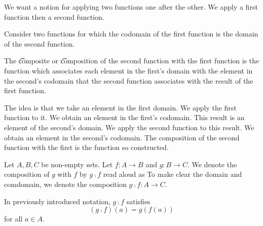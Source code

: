 
\sbasic













\sstart
{}


We want a notion
for applying
two functions
one after the other.
We apply a first function
then a second function.


Consider
two functions
for which the codomain
of the first function
is the domain of the
second function.

The
\t{composite} or \t{composition}
of the second function with
the first function
is the function which
associates each element
in the first's domain
with the element in
the second's codomain
that the second function
associates with the
result of the first function.

The idea is that we take
an element in the first
domain.
We apply the first function
to it.
We obtain an element in the
first's codomain.
This result is an element of
the second's domain.
We apply the second function
to this result.
We obtain an element
in the second's codomain.
The composition of the second
function with the first
is the function so constructed.


Let $A, B, C$ be
non-empty sets.
Let $f: A \to B$
and $g: B \to C$.
We denote the
composition
of $g$ with $f$
by
$g \comp f$
read aloud as
To make clear the domain
and comdomain, we denote
the composition
$g \comp f: A \to C$.

In previously introduced
notation,
$g \comp f$
satisfies
\[
  (g \comp f)(a) = g(f(a))
\]
for all $a \in A$.
\strats
